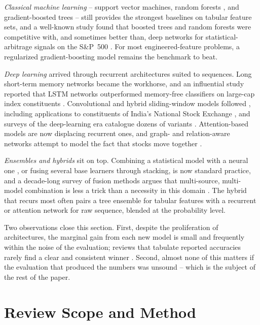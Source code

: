 \documentclass[10pt,a4paper,twocolumn]{article}
\begin{document}
\textit{Classical machine learning} -- support vector machines, random forests \cite{breiman2001}, and gradient-boosted trees \cite{chen2016,ke2017} -- still provides the strongest baselines on tabular feature sets, and a well-known study found that boosted trees and random forests were competitive with, and sometimes better than, deep networks for statistical-arbitrage signals on the S\&P~500 \cite{krauss2017}. For most engineered-feature problems, a regularized gradient-boosting model remains the benchmark to beat.

\textit{Deep learning} arrived through recurrent architectures suited to sequences. Long short-term memory networks \cite{hochreiter1997} became the workhorse, and an influential study reported that LSTM networks outperformed memory-free classifiers on large-cap index constituents \cite{fischer2018}. Convolutional and hybrid sliding-window models followed \cite{selvin2017,bao2017}, including applications to constituents of India's National Stock Exchange \cite{hiransha2018}, and surveys of the deep-learning era catalogue dozens of variants \cite{sezer2020,limzohren2021}. Attention-based models \cite{vaswani2017} are now displacing recurrent ones, and graph- and relation-aware networks attempt to model the fact that stocks move together \cite{feng2019,sawhney2020}.

\textit{Ensembles and hybrids} sit on top. Combining a statistical model with a neural one \cite{zhang2003}, or fusing several base learners through stacking, is now standard practice, and a decade-long survey of fusion methods argues that multi-source, multi-model combination is less a trick than a necessity in this domain \cite{thakkar2021}. The hybrid that recurs most often pairs a tree ensemble for tabular features with a recurrent or attention network for raw sequence, blended at the probability level.

Two observations close this section. First, despite the proliferation of architectures, the marginal gain from each new model is small and frequently within the noise of the evaluation; reviews that tabulate reported accuracies rarely find a clear and consistent winner \cite{bustos2020,henrique2021review}. Second, almost none of this matters if the evaluation that produced the numbers was unsound -- which is the subject of the rest of the paper.

\section{Review Scope and Method}
\end{document}
